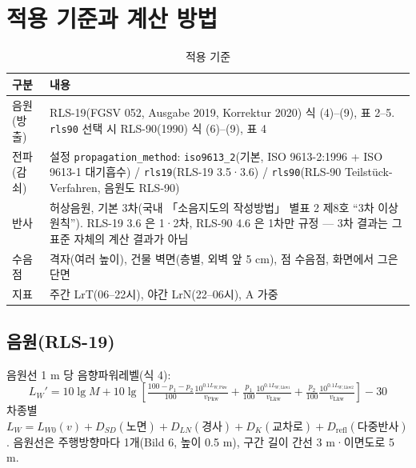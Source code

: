 \documentclass[10pt,a4paper]{article}
\newcommand{\f}[1]{\texttt{#1}}
\begin{document}
\section{적용 기준과 계산 방법}
\begin{table}[h]\centering\small
\caption{적용 기준}
\begin{tabularx}{\textwidth}{P{26mm}L}
\toprule
구분 & 내용 \\ \midrule
음원(방출) & RLS-19(FGSV 052, Ausgabe 2019, Korrektur 2020) 식 (4)–(9), 표 2–5. \f{rls90} 선택 시 RLS-90(1990) 식 (6)–(9), 표 4 \\
전파(감쇠) & 설정 \f{propagation\_method}: \f{iso9613\_2}(기본, ISO 9613-2:1996 + ISO 9613-1 대기흡수) / \f{rls19}(RLS-19 3.5·3.6) / \f{rls90}(RLS-90 Teilstück-Verfahren, 음원도 RLS-90) \\
반사 & 허상음원, 기본 3차(국내 「소음지도의 작성방법」 별표 2 제8호 ``3차 이상 원칙''). RLS-19 3.6 은 1·2차, RLS-90 4.6 은 1차만 규정 — 3차 결과는 그 표준 자체의 계산 결과가 아님 \\
수음점 & 격자(여러 높이), 건물 벽면(층별, 외벽 앞 5 cm), 점 수음점, 화면에서 그은 단면 \\
지표 & 주간 LrT(06–22시), 야간 LrN(22–06시), A 가중 \\
\bottomrule
\end{tabularx}
\end{table}

\subsection{음원(RLS-19)}
음원선 1 m 당 음향파워레벨(식 4):
\begin{equation*}
L_W' = 10\lg M + 10\lg\!\left[\tfrac{100-p_1-p_2}{100}\tfrac{10^{0.1L_{W,\mathrm{Pkw}}}}{v_\mathrm{Pkw}} + \tfrac{p_1}{100}\tfrac{10^{0.1L_{W,\mathrm{Lkw1}}}}{v_\mathrm{Lkw}} + \tfrac{p_2}{100}\tfrac{10^{0.1L_{W,\mathrm{Lkw2}}}}{v_\mathrm{Lkw}}\right] - 30
\end{equation*}
차종별 $L_W = L_{W0}(v) + D_{SD}(\text{노면}) + D_{LN}(\text{경사}) + D_K(\text{교차로}) + D_\mathrm{refl}(\text{다중반사})$. 음원선은 주행방향마다 1개(Bild 6, 높이 0.5 m), 구간 길이 간선 3 m·이면도로 5 m.
\end{document}
